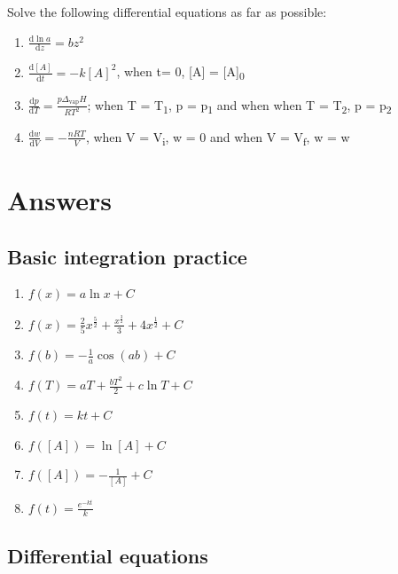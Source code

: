 \documentclass[
]{book}
\providecommand{\tightlist}{%
  \setlength{\itemsep}{0pt}\setlength{\parskip}{0pt}}
\begin{document}
Solve the following differential equations as far as possible:

\begin{enumerate}
\def\labelenumi{\arabic{enumi}.}
\tightlist
\item
  \(\frac{\textrm{d}\ln a}{\textrm{d}z}= bz^2\)
\item
  \(\frac{\textrm{d}[A]}{\textrm{d}t} = -k[A]^2\), when t= 0, {[}A{]} = {[}A{]}\textsubscript{0}
\item
  \(\frac{\textrm{d}p}{\textrm{d}T}=\frac{p\Delta_{\textrm{vap}}H}{RT^2}\); when T = T\textsubscript{1}, p = p\textsubscript{1} and when when T = T\textsubscript{2}, p = p\textsubscript{2}
\item
  \(\frac{\textrm{d}w}{\textrm{d}V}= -\frac{nRT}{V}\), when V = V\textsubscript{i}, w = 0 and when V = V\textsubscript{f}, w = w
\end{enumerate}

\hypertarget{sec:Answers6}{%
\section{Answers}\label{sec:Answers6}}

\hypertarget{basic-integration-practice-1}{%
\subsection{Basic integration practice}\label{basic-integration-practice-1}}

\begin{enumerate}
\def\labelenumi{\arabic{enumi}.}
\tightlist
\item
  \(f (x) = a \ln x + C\)
\item
  \(f(x) = \frac{2}{5} x^{\frac{5}{2}}+ \frac{x^{\frac{3}{2}}}{3}+4x^{\frac{1}{2}}+C\)
\item
  \(f(b) =-\frac{1}{a}\cos (ab) + C\)
\item
  \(f(T) = aT + \frac{bT^2}{2} + c\ln T + C\)
\item
  \(f(t) = kt +C\)
\item
  \(f([A])= \ln [A] + C\)
\item
  \(f([A])=-\frac{1}{[A]}+ C\)
\item
  \(f(t) = \frac{e^{-kt}}{k}\)
\end{enumerate}

\hypertarget{differential-equations-1}{%
\subsection{Differential equations}\label{differential-equations-1}}
\end{document}
